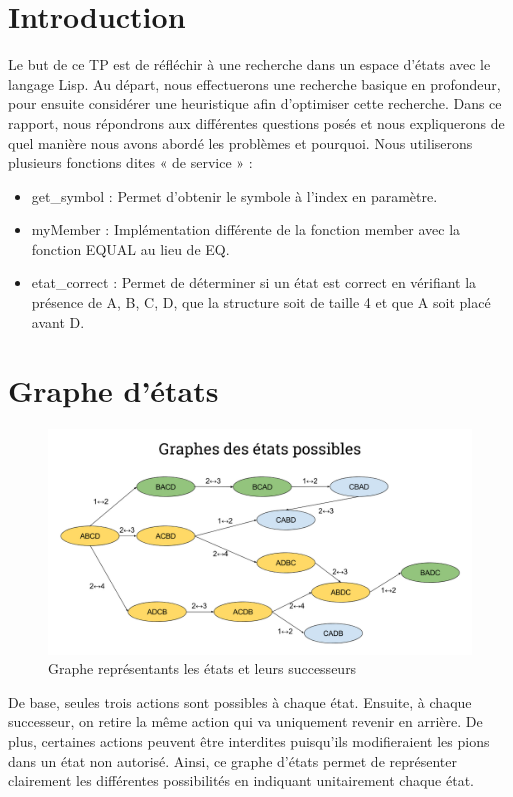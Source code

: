 \documentclass[a4paper,10pt]{report}
\begin{document}
\chapter*{Introduction}

Le but de ce TP est de réfléchir à une recherche dans un espace d’états avec le langage Lisp. Au départ, nous effectuerons une recherche basique en profondeur,
pour ensuite considérer une heuristique afin d'optimiser cette recherche. 
Dans ce rapport, nous répondrons aux différentes questions posés et nous expliquerons de quel manière nous avons abordé les problèmes et pourquoi.
Nous utiliserons plusieurs fonctions dites « de service » :

\begin{itemize}
 \item get\_symbol : Permet d'obtenir le symbole à l'index en paramètre.
 \item myMember : Implémentation différente de la fonction member avec la fonction EQUAL au lieu de EQ.
 \item etat\_correct : Permet de déterminer si un état est correct en vérifiant la présence de A, B, C, D, que la structure soit de taille 4 et que A soit placé avant D.
 \end{itemize}



\chapter{Graphe d'états}

\begin{figure}[h!]
  \centering
 \includegraphics[scale=0.4]{Graphe_D_Etat.png}
 \caption{Graphe représentants les états et leurs successeurs}
\end{figure}

De base, seules trois actions sont possibles à chaque état. Ensuite, à chaque successeur, on retire la même action qui va uniquement revenir en arrière. De plus, certaines actions peuvent être interdites puisqu’ils modifieraient les pions dans un état non autorisé. Ainsi, ce graphe d’états permet de représenter clairement les différentes possibilités en indiquant unitairement chaque état.
\end{document}
